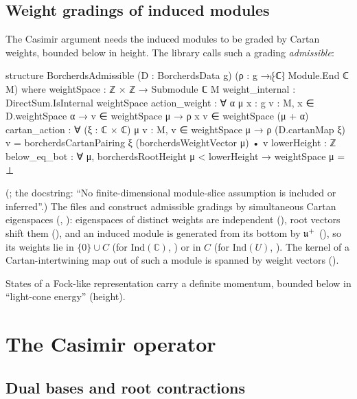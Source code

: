 \subsection{Weight gradings of induced modules}

The Casimir argument needs the induced modules to be graded by Cartan weights, bounded below in height.  The library calls
such a grading \emph{admissible}:
\begin{leancode}
structure BorcherdsAdmissible (D : BorcherdsData g)
    (ρ : g →ₗ⁅ℂ⁆ Module.End ℂ M) where
  weightSpace : ℤ × ℤ → Submodule ℂ M
  weight_internal : DirectSum.IsInternal weightSpace
  action_weight : ∀ {α μ} {x : g} {v : M},
    x ∈ D.weightSpace α → v ∈ weightSpace μ → ρ x v ∈ weightSpace (μ + α)
  cartan_action : ∀ (ξ : ℂ × ℂ) {μ} {v : M}, v ∈ weightSpace μ →
    ρ (D.cartanMap ξ) v = borcherdsCartanPairing ξ (borcherdsWeightVector μ) • v
  lowerHeight : ℤ
  below_eq_bot : ∀ μ, borcherdsRootHeight μ < lowerHeight → weightSpace μ = ⊥
\end{leancode}
(; the docstring: ``No finite-dimensional module-slice assumption is
included or inferred''.)  The files  and
 construct admissible gradings by simultaneous Cartan eigenspaces
(, ): eigenspaces of distinct weights are independent
(), root vectors shift them (), and an induced module is
generated from its bottom by $\mathfrak{u}^+$ (), so its weights lie in $\{0\}\cup C$ (for $\mathrm{Ind}(\mathbb C)$,
) or in $C$ (for $\mathrm{Ind}(U)$, ).  The kernel of a Cartan-intertwining map
out of such a module is spanned by weight vectors ().
\begin{physics}States of a Fock-like representation carry a definite momentum, bounded below in ``light-cone energy'' (height).\end{physics}

\section{The Casimir operator}\label{ch18:sec:casimir}

\subsection{Dual bases and root contractions}

